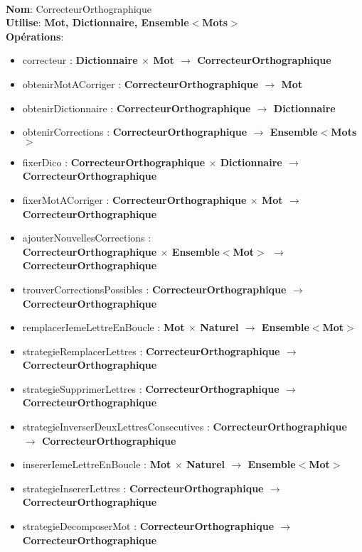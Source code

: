 \documentclass{article}
\begin{document}
    \noindent
    \\
    \textbf{Nom}: CorrecteurOrthographique \\
    \textbf{Utilise}: \textbf{Mot, Dictionnaire, Ensemble$<$Mots$>$} \\
    \textbf{Opérations}: \begin{itemize}[label=$\ $, leftmargin=2cm, itemsep=0cm]
        \item correcteur : \textbf{Dictionnaire $\times$ Mot $\rightarrow$ CorrecteurOrthographique}
        \item obtenirMotACorriger : \textbf{CorrecteurOrthographique $\rightarrow$ Mot}
        \item obtenirDictionnaire : \textbf{CorrecteurOrthographique $\rightarrow$ Dictionnaire}
        \item obtenirCorrections : \textbf{CorrecteurOrthographique $\rightarrow$ Ensemble$<$Mots$>$}
        \item fixerDico : \textbf{CorrecteurOrthographique $\times$ Dictionnaire $\rightarrow$ CorrecteurOrthographique}
        \item fixerMotACorriger : \textbf{CorrecteurOrthographique $\times$ Mot $\rightarrow$ CorrecteurOrthographique}
        \item ajouterNouvellesCorrections : \\ \textbf{CorrecteurOrthographique $\times$ Ensemble$<$Mot$>$ $\rightarrow$ CorrecteurOrthographique}
        \item trouverCorrectionsPossibles : \textbf{CorrecteurOrthographique $\rightarrow$ CorrecteurOrthographique}
        \item remplacerIemeLettreEnBoucle : \textbf{Mot $\times$ Naturel $\rightarrow$ Ensemble$<$Mot$>$}
        \item strategieRemplacerLettres : \textbf{CorrecteurOrthographique $\rightarrow$ CorrecteurOrthographique}
        \item strategieSupprimerLettres : \textbf{CorrecteurOrthographique $\rightarrow$ CorrecteurOrthographique}
        \item strategieInverserDeuxLettresConsecutives : \textbf{CorrecteurOrthographique $\rightarrow$ CorrecteurOrthographique}
        \item insererIemeLettreEnBoucle : \textbf{Mot $\times$ Naturel $\rightarrow$ Ensemble$<$Mot$>$}
        \item strategieInsererLettres : \textbf{CorrecteurOrthographique $\rightarrow$ CorrecteurOrthographique}
        \item strategieDecomposerMot : \textbf{CorrecteurOrthographique $\rightarrow$ CorrecteurOrthographique}
    \end{itemize}
\end{document}
